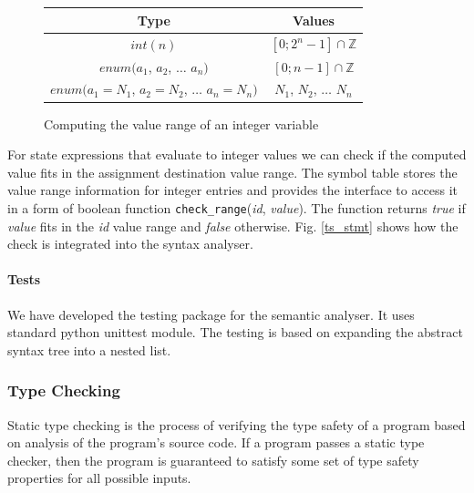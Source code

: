 
\begin{figure}[h!]
\centering
\begin{tabular}{|c|c|}
\hline
Type & Values\\
\hline
$int(n)$ & $[0; 2^{n}-1] \cap \mathbb{Z}$\\
\hline
$enum(a_1$, $a_2$, $\dots$ $a_n)$ & $[0; n-1] \cap \mathbb{Z}$\\
\hline
$enum(a_1=N_1$, $a_2=N_2$, $\dots$ $a_n=N_n)$ & $N_1$, $N_2$, $\dots$ $N_n$\\
\hline
\end{tabular}
\caption{Computing the value range of an integer variable\label{int_range}}
\end{figure}

For state expressions that evaluate to integer values we can check if the computed value fits in the assignment destination value range. The symbol table stores the value range information for integer entries and provides the interface to access it in a form of boolean function \texttt{check\_range}(\emph{id}, \emph{value}). The function returns \emph{true} if \emph{value} fits in the \emph{id} value range and \emph{false} otherwise. Fig. \ref{ts_stmt} shows how the check is integrated into the syntax analyser.



    \paragraph{Tests}
We have developed the testing package for the semantic analyser. It uses standard python unittest module. The testing is based on expanding the abstract syntax tree into a nested list.


  \subsubsection{Type Checking\label{type_check}}
Static type checking is the process of verifying the type safety of a program based on analysis of the program's source code. If a program passes a static type checker, then the program is guaranteed to satisfy some set of type safety properties for all possible inputs.


